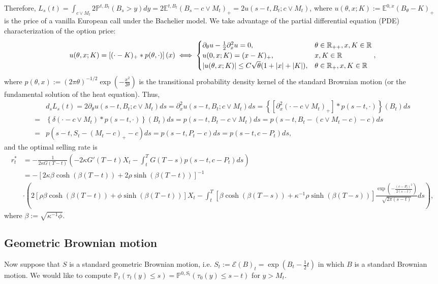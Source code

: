 \documentclass[openany,oneside]{article}
\theoremstyle{definition}
\theoremstyle{remark}
\newcommand{\E}{\mathbb{E}} %
\renewcommand{\P}{\mathbb{P}} %
\DeclarePairedDelimiter{\abs}{\lvert}{\rvert} %
\begin{document}
Therefore, $L_s(t)=\int_{c\vee M_t}2\P^{t,B_t}(B_s > y) dy=2\E^{t,B_t}(B_s-c\vee M_t)_+ = 2u(s-t,B_t; c\vee M_t)$, where $u(\theta,x;K):=\E^{0,x}(B_\theta-K)_+$ is the price of a vanilla European call under the Bachelier model. We take advantage of the partial differential equation (PDE) characterization of the option price:
\begin{align*}
u(\theta,x;K) = \left[(\cdot-K)_+ \ast p(\theta,\cdot)\right](x) \iff
\begin{cases}
\partial_\theta u - \frac{1}{2}\partial^2_x u =0, & \theta\in\mathbb{R}_{++}, x,K\in\mathbb{R} \\
u(0,x;K)=(x-K)_+, & x,K\in\mathbb{R} \\
\abs{u(\theta,x;K)} \le C\sqrt{\theta}(1+\abs{x}+\abs{K}), & \theta\in\mathbb{R}_+, x,K\in\mathbb{R}
\end{cases},
\end{align*}
where $p(\theta,x):=(2\pi\theta)^{-1/2}\exp\left(-\frac{x^2}{2\theta}\right)$ is the transitional probability density kernel of the standard Brownian motion (or the fundamental solution of the heat equation). Thus,
\begin{align*}
& d_s L_s(t) = 2\partial_\theta u(s-t,B_t;c\vee M_t) ds = \partial^2_x u(s-t,B_t;c\vee M_t) ds = \left\{\left[\partial^2_x (\cdot-c\vee M_t)_+\right]\ast p(s-t,\cdot)\right\}(B_t) ds \\
=& \left\{\delta(\cdot-c\vee M_t) \ast p(s-t,\cdot)\right\}(B_t) ds = p(s-t,B_t-c\vee M_t)ds = p(s-t,B_t-(c\vee M_t-c)-c) ds \\
=& p(s-t, S_t-(M_t-c)_+ -c) ds = p(s-t,P_t-c)ds = p(s-t,c-P_t)ds,
\end{align*}
and the optimal selling rate is
\begin{align*}
r^\ast_t &= -\frac{1}{2\kappa G(T-t)}\left(-2\kappa G'(T-t) X_t - \int_t^T G(T-s)p(s-t,c-P_t) ds\right) \\
&= -\left[2\kappa\beta\cosh(\beta (T-t))+2\rho\sinh(\beta (T-t))\right]^{-1} \\
& \cdot \left( 2\left[\rho\beta\cosh(\beta (T-t))+\phi\sinh(\beta (T-t))\right] X_t - \int_t^T \left[\beta\cosh(\beta (T-s))+\kappa^{-1}\rho\sinh(\beta (T-s))\right] \frac{\exp{\left(-\frac{(c-P_t)^2}{2(s-t)}\right)}}{\sqrt{2\pi(s-t)}} ds \right),
\end{align*}
where $\beta:=\sqrt{\kappa^{-1}\phi}$.

\subsection{Geometric Brownian motion}
Now suppose that $S$ is a standard geometric Brownian motion, i.e. $S_t:=\mathcal{E}(B)_t = \exp\left(B_t-\frac{1}{2}t\right)$ in which $B$ is a standard Brownian motion. We would like to compute $\P_t(\tau_t(y)\le s) = \P^{0,S_t}(\tau_0(y)\le s-t)$ for $y>M_t$.
\end{document}
